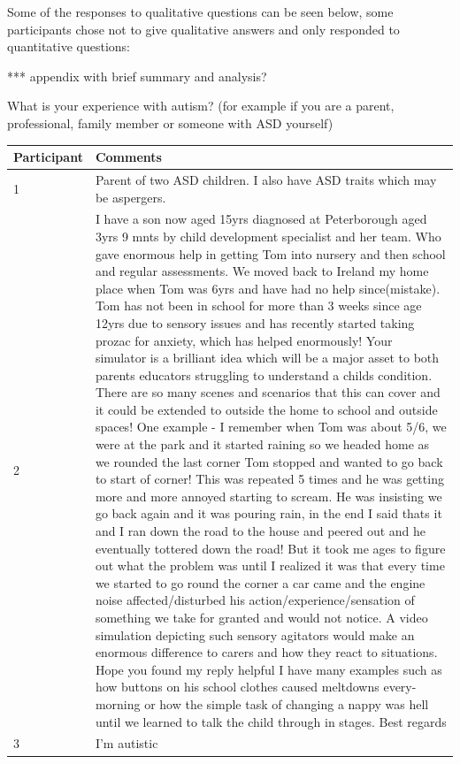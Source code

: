 \documentclass[11pt]{report}
\begin{document}
Some of the responses to qualitative questions can be seen below, some participants chose not to give qualitative answers and only responded to quantitative questions:

*** appendix with brief summary and analysis?

What is your experience with autism? (for example if you are a parent, professional, family member or someone with ASD yourself)
\begin{table}[H]
    \begin{tabular}{| p{3cm} | p{12cm} |}
    \hline
     Participant & Comments \\ \hline
     1 & Parent of two ASD children. I also have ASD traits which may be aspergers. \\ \hline
     2 & I have a son now aged 15yrs diagnosed at Peterborough aged 3yrs 9 mnts by child development specialist and her team. Who gave enormous help in getting Tom into nursery and then school and regular assessments. We moved back to Ireland my home place when Tom was 6yrs and have had no help since(mistake). Tom has not been in school for more than 3 weeks since age 12yrs due to sensory issues and has recently started taking prozac for anxiety, which has helped enormously! Your simulator is a brilliant idea which will be a major asset to both parents educators struggling to understand a childs condition. There are so many scenes and scenarios that this can cover and it could be extended to outside the home to school and outside spaces! One example - I remember when Tom was about 5/6, we were at the park and it started raining so we headed home as we rounded the last corner Tom stopped and wanted to go back to start of corner! This was repeated 5 times and he was getting more and more annoyed starting to scream. He was insisting we go back again and it was pouring rain, in the end I said thats it and I ran down the road to the house and peered out and he eventually tottered down the road! But it took me ages to figure out what the problem was until I realized it was that every time we started to go round the corner a car came and the engine noise affected/disturbed his action/experience/sensation of something we take for granted and would not notice. A video simulation depicting such sensory agitators would make an enormous difference to carers and how they react to situations. Hope you found my reply helpful I have many examples such as how buttons on his school clothes caused meltdowns every-morning or how the simple task of changing a nappy was hell until we learned to talk the child through in stages. Best regards  \\ \hline
     3 &  I'm autistic  \\ \hline
    \end{tabular}
\end{table}
\end{document}
